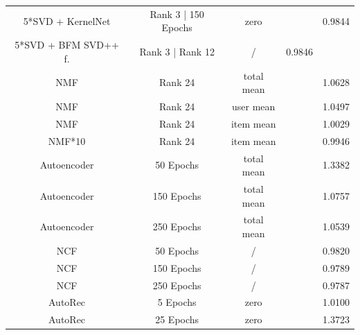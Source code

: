 \documentclass[10pt,conference,compsocconf]{IEEEtran}
\begin{document}
\begin{table}
{\begin{tabular}{|| c | c | c | c | c ||}
            5*SVD + KernelNet    & Rank 3 | 150 Epochs                   & zero                    &                        & 0.9844                  \\
            5*SVD + BFM SVD++ f. & Rank 3 | Rank 12                      & /                       & 0.9846                 &                         \\
            \hline
            NMF                  & Rank 24                               & total mean              &                        & 1.0628                  \\
            NMF                  & Rank 24                               & user mean               &                        & 1.0497                  \\
            NMF                  & Rank 24                               & item mean               &                        & 1.0029                  \\
            NMF*10               & Rank 24                               & item mean               &                        & 0.9946                  \\
            \hline
            Autoencoder          & 50 Epochs                             & total mean              &                        & 1.3382                  \\
            Autoencoder          & 150 Epochs                            & total mean              &                        & 1.0757                  \\
            Autoencoder          & 250 Epochs                            & total mean              &                        & 1.0539                  \\
            \hline
            NCF                  & 50 Epochs                             & /                       &                        & 0.9820                  \\
            NCF                  & 150 Epochs                            & /                       &                        & 0.9789                  \\
            NCF                  & 250 Epochs                            & /                       &                        & 0.9787                  \\
            \hline
            AutoRec              & 5 Epochs                              & zero                    &                        & 1.0100                  \\
            AutoRec              & 25 Epochs                             & zero                    &                        & 1.3723                  \\

\end{tabular}}
\end{table}
\end{document}
